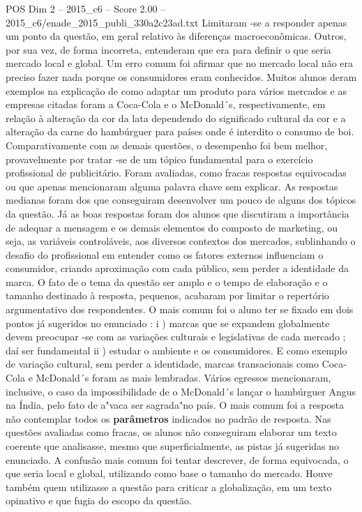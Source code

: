 \begin{textsample}{POS Dim 2 – 2015\_c6 – Score 2.00 – 2015\_c6/enade\_2015\_publi\_330a2c23ad.txt}
Limitaram -se a responder apenas um ponto da questão, em geral relativo às diferenças macroeconômicas.
Outros, por sua vez, de forma incorreta, entenderam que era para definir o que seria mercado local e global.
Um erro comum foi afirmar que no mercado local não era preciso fazer nada porque os consumidores eram conhecidos.
Muitos alunos deram exemplos na explicação de como adaptar um produto para vários mercados e as empresas citadas foram a Coca-Cola e o McDonald´s, respectivamente, em relação à alteração da cor da lata dependendo do significado cultural da cor e a alteração da carne do hambúrguer para países onde é interdito o consumo de boi.
Comparativamente com as demais questões, o desempenho foi bem melhor, provavelmente por tratar -se de um tópico fundamental para o exercício profissional de publicitário.
Foram avaliadas, como fracas respostas equivocadas ou que apenas mencionaram alguma palavra chave sem explicar.
As respostas medianas foram dos que conseguiram desenvolver um pouco de alguns dos tópicos da questão.
Já as boas respostas foram dos alunos que discutiram a importância de adequar a mensagem e os demais elementos do composto de marketing, ou seja, as variáveis controláveis, aos diversos contextos dos mercados, sublinhando o desafio do profissional em entender como os fatores externos influenciam o consumidor, criando aproximação com cada público, sem perder a identidade da marca.
O fato de o tema da questão ser amplo e o tempo de elaboração e o tamanho destinado à resposta, pequenos, acabaram por limitar o repertório argumentativo dos respondentes.
O mais comum foi o aluno ter se fixado em dois pontos já sugeridos no enunciado : i ) marcas que se expandem globalmente devem preocupar -se com as variações culturais e legislativas de cada mercado ; daí ser fundamental ii ) estudar o ambiente e os consumidores.
E como exemplo de variação cultural, sem perder a identidade, marcas transacionais como Coca-Cola e McDonald´s foram as mais lembradas.
Vários egressos mencionaram, inclusive, o caso da impossibilidade de o McDonald´s lançar o hambúrguer Angus na Índia, pelo fato de a"vaca ser sagrada"no país.
O mais comum foi a resposta não contemplar todos os \textbf{parâmetros} indicados no padrão de resposta.
Nas questões avaliadas como fracas, os alunos não conseguiram elaborar um texto coerente que analisasse, mesmo que superficialmente, as pistas já sugeridas no enunciado.
A confusão mais comum foi tentar descrever, de forma equivocada, o que seria local e global, utilizando como base o tamanho do mercado.
Houve também quem utilizasse a questão para criticar a globalização, em um texto opinativo e que fugia do escopo da questão.

\end{textsample}
